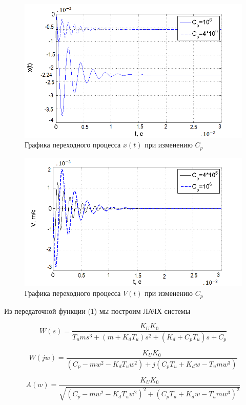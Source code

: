 \documentclass[a4paper, 12pt]{article}
\begin{document}
\begin{figure}[h]
	\centering
	\includegraphics[width=0.9\linewidth]{9}
	\caption{Графика переходного процесса $x(t)$ при изменению $C_{p}$}
	\label{}
\end{figure}
\begin{figure}[h]
	\centering
	\includegraphics[width=0.9\linewidth]{11}
	\caption{Графика переходного процесса $V(t)$ при изменению $C_{p}$}
	\label{}
\end{figure}
\newpage
Из передаточной функции (1) мы построим ЛАЧХ системы\par 


\begin{equation}
W(s) = \frac{{{K_U}{K_0}}}{{{T_u}m{s^3} + (m + {K_d}{T_u}){s^2} + ({K_d} + {C_p}{T_u})s + {C_p}}}
\end{equation}

\begin{equation}
W(jw) = \frac{{{K_U}{K_0}}}{{({C_p} - m{w^2} - {K_d}{T_u}{w^2}) + j({C_p}{T_u} + {K_d}w - {T_u}m{w^3})}}
\end{equation}

\begin{equation}
A(w) = \frac{{{K_U}{K_0}}}{{\sqrt {{{({C_p} - m{w^2} - {K_d}{T_u}{w^2})}^2} + {{({C_p}{T_u} + {K_d}w - {T_u}m{w^3})}^2}} }}
\end{equation}
\end{document}
